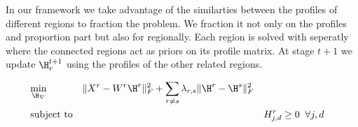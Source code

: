 



In our framework we take advantage of the similarties between the profiles of different regions to fraction the problem. We fraction it not only on the profiles and proportion part but also for regionally. 
Each region is solved with seperatly where the connected regions act as priors on its profile matrix.
At stage $t+1$ we update $ \H_r^{t+1} $ using the profiles of the other related regions.

\begin{equation*}
    \label{eq-multi}
    \begin{aligned}
        & \underset{\cal{\H_r}}{\text{min}}  
        & & \| X^r - W^r \H^r \|_F^2+ \sum_{r \neq s}
   \lambda_{r , s} \| \H^r - \H^s \|_F^2  \\
        & \text{subject to} &
        & & & H^r_{j,d} \geq 0 \;\;\forall j, d \\
    \end{aligned}
\end{equation*}


